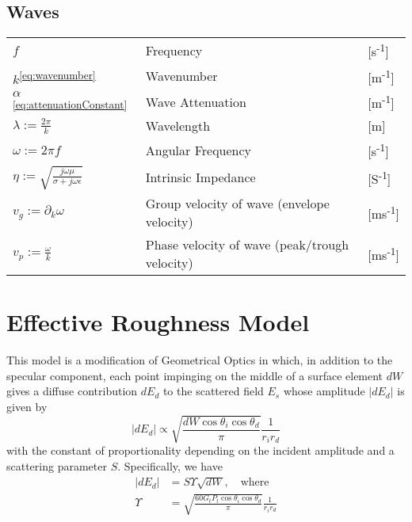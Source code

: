\documentclass{article}
\numberwithin{equation}{section}
\begin{document}
        \subsection*{Waves}
            \begin{tabular}{ m{7em} m{24em} m{4em} }
                \( \displaystyle f \) & Frequency & [s\textsuperscript{-1}] \\
                \( \displaystyle k \)\textsuperscript{\eqref{eq:wavenumber}} &
                    Wavenumber & [m\textsuperscript{-1}]  \\
                \( \displaystyle \alpha \)\textsuperscript{\eqref{eq:attenuationConstant}}
                    & Wave Attenuation & [m\textsuperscript{-1}]  \\
                \( \displaystyle \lambda := \frac{2 \pi}{k} \) & Wavelength & [m] \\
                \( \displaystyle \omega := 2 \pi f \) & Angular Frequency &
                    [s\textsuperscript{-1}] \\
                \( \displaystyle \eta := \sqrt{\frac{j \omega \mu}{\sigma + j \omega
                    \epsilon}} \) &
                    Intrinsic Impedance & [S\textsuperscript{-1}] \\
                \( \displaystyle v_g := \partial_k \omega \) & Group velocity of wave
                    (envelope velocity) & [ms\textsuperscript{-1}]  \\
                \( \displaystyle v_p := \frac{\omega}{k} \) & Phase velocity of wave
                    (peak/trough velocity) & [ms\textsuperscript{-1}]  \\
            \end{tabular}
            \normalsize
    \newpage
    \section{Effective Roughness Model}
        This model is a modification of Geometrical Optics in which, in addition to the
        specular component, each point impinging on the middle of a surface element $dW$
        gives a diffuse contribution $dE_d$ to the scattered field $E_s$ whose amplitude
        $\left| dE_d \right|$ is given by
        \begin{equation} \label{eq:scatteringAmpER}
           \left| dE_d \right| \propto \sqrt{\frac{dW \cos \theta_i \cos \theta_d}{\pi}}
           \frac{1}{r_i r_d}
        \end{equation}
        with the constant of proportionality depending on the incident amplitude and a
        scattering parameter $S$. Specifically, we have
        \begin{subequations}
            \begin{align}
                \left| dE_d \right| &= S \Upsilon \sqrt{dW}, \quad \text{where} \\
                \Upsilon &= \sqrt{\frac{60 G_t P_t \cos \theta_i \cos \theta_d}{\pi}}
                \frac{1}{r_i r_d}
            \end{align}
        \end{subequations}
\end{document}
